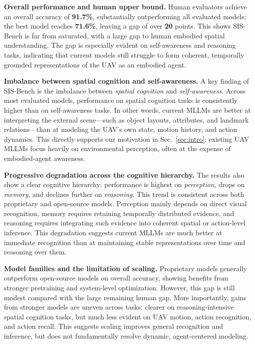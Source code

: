 \documentclass[sigconf, screen, review, anonymous]{acmart}
\begin{document}
\noindent\textbf{Overall performance and human upper bound.}
Human evaluators achieve an overall accuracy of \textbf{91.7\%}, substantially outperforming all evaluated models; the best model reaches \textbf{71.6\%}, leaving a gap of over \textbf{20} points. This shows SIS-Bench is far from saturated, with a large gap to human embodied spatial understanding. The gap is especially evident on self-awareness and reasoning tasks, indicating that current models still struggle to form coherent, temporally grounded representations of the UAV as an embodied agent.

\noindent\textbf{Imbalance between spatial cognition and self-awareness.}
A key finding of SIS-Bench is the imbalance between \emph{spatial cognition} and \emph{self-awareness}. Across most evaluated models, performance on spatial cognition tasks is consistently higher than on self-awareness tasks. In other words, current MLLMs are better at interpreting the external scene---such as object layouts, attributes, and landmark relations---than at modeling the UAV's own state, motion history, and action dynamics. This directly supports our motivation in Sec.~\ref{sec:intro}: existing UAV MLLMs focus heavily on environmental perception, often at the expense of embodied-agent awareness.

\noindent\textbf{Progressive degradation across the cognitive hierarchy.}
The results also show a clear cognitive hierarchy: performance is highest on \emph{perception}, drops on \emph{memory}, and declines further on \emph{reasoning}. This trend is consistent across both proprietary and open-source models. Perception mainly depends on direct visual recognition, memory requires retaining temporally distributed evidence, and reasoning requires integrating such evidence into coherent spatial or action-level inference. This degradation suggests current MLLMs are much better at immediate recognition than at maintaining stable representations over time and reasoning over them.

\noindent\textbf{Model families and the limitation of scaling.}
Proprietary models generally outperform open-source models on overall accuracy, showing benefits from stronger pretraining and system-level optimization. However, this gap is still modest compared with the large remaining human gap. More importantly, gains from stronger models are uneven across tasks: clearer on reasoning-intensive spatial cognition tasks, but much less evident on UAV motion, action recognition, and action recall. This suggests scaling improves general recognition and inference, but does not fundamentally resolve dynamic, agent-centered modeling.
\end{document}
